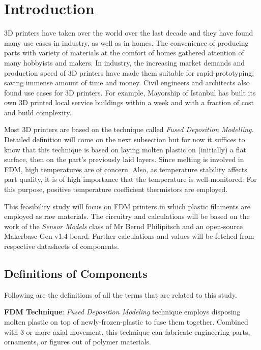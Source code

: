 \section*{Introduction}
\par
3D printers have taken over the world over the last decade and
they have
found many use cases in industry, as well as in homes. The convenience of producing parts with variety of materials at the comfort of homes gathered attention of many hobbyists and makers. In
industry, the increasing market demands and production speed of 3D printers have made
them suitable for rapid-prototyping; saving immense amount of time and
money. Civil engineers and architects also found use
cases for 3D printers. For example, Mayorship of Istanbul has built its own
3D printed
local service buildings within a week and with a fraction of cost and build
complexity.

Most 3D printers are based on the technique called \textit{Fused Deposition Modelling.} Detailed definition will come on the next subsection but for now it suffices to know that this technique is based on laying molten plastic on (initially) a flat surface, then on the part's previously laid layers. Since melting is involved in FDM, high temperatures are of concern. Also, as temperature stability affects part quality, it is of high importance that the temperature is well-monitored. For this purpose, positive temperature coefficient thermistors are employed.

This feasibility study will focus on FDM printers in which plastic filaments are employed as raw materials. The circuitry and calculations will be based on the work of the \textit{Sensor Models} class of Mr Bernd Philipitsch and an open-source Makerbase Gen v1.4 board. Further calculations and values will be fetched from respective datasheets of components.

\subsection{Definitions of Components}

Following are the definitions of all the terms that are related to this study.

\textbf{FDM Technique}: \textit{Fused Deposition Modeling} technique employs disposing molten plastic on top of newly-frozen-plastic to fuse them together. Combined with 3 or more axial movement, this technique can fabricate engineering parts, ornaments, or figures out of polymer materials.

